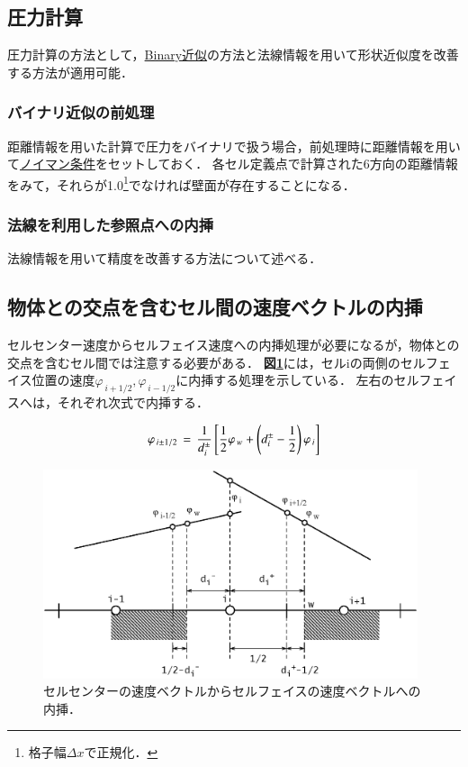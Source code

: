 %
\subsection{圧力計算}
圧力計算の方法として，\hyperlink{tgt:Poisson Binary}{Binary近似}の方法と法線情報を用いて形状近似度を改善する方法が適用可能．

%
\subsubsection{バイナリ近似の前処理}
距離情報を用いた計算で圧力をバイナリで扱う場合，前処理時に距離情報を用いて\hyperlink{tgt:EBCS poisson BC}{ノイマン条件}をセットしておく．
各セル定義点で計算された6方向の距離情報をみて，それらが1.0\footnote{格子幅$\Delta x$で正規化．}でなければ壁面が存在することになる．

%
\subsubsection{法線を利用した参照点への内挿}
法線情報を用いて精度を改善する方法について述べる．


%
\subsection{物体との交点を含むセル間の速度ベクトルの内挿}
セルセンター速度からセルフェイス速度への内挿処理が必要になるが，物体との交点を含むセル間では注意する必要がある．
\textbf{図\ref{fig:interpolation cc2cf}}には，セル{i}の両側のセルフェイス位置の速度$\varphi_{\,i+1/2}, \varphi_{\,i-1/2}$に内挿する処理を示している．
左右のセルフェイスへは，それぞれ次式で内挿する．

\begin{equation}
\displaystyle{ \varphi_{\,i\pm1/2} \,=\, \frac{1}{d_i^{\pm}} \left[ \frac{1}{2} \varphi_{\,w} + \left( d_i^{\pm} - \frac{1}{2} \right) \varphi_{\,i} \right] }\\
\label{eq:interpolation cc2cf}
\end{equation}


\begin{figure}[htbp]
\begin{center}
\includegraphics[width=11cm,clip]{intp_cut.eps}
\end{center}
\caption{セルセンターの速度ベクトルからセルフェイスの速度ベクトルへの内挿．}
\label{fig:interpolation cc2cf}
\end{figure}

